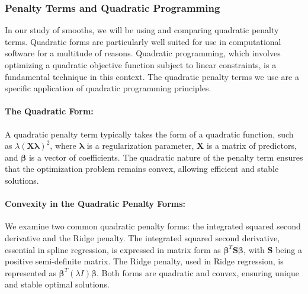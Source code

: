 \documentclass[12pt, twoside,hidelinks]{article}
\theoremstyle{definition}
\numberwithin{equation}{section}
\begin{document}
\subsubsection{Penalty Terms and Quadratic Programming}\label{sec:smooth:penreg:quadratic}

In our study of smooths, we will be using and comparing quadratic penalty terms. Quadratic forms are particularly well suited for use in computational software for a multitude of reasons. Quadratic programming, which involves optimizing a quadratic objective function subject to linear constraints, is a fundamental technique in this context. The quadratic penalty terms we use are a specific application of quadratic programming principles.

\paragraph{The Quadratic Form:}
A quadratic penalty term typically takes the form of a quadratic function, such as \( \lambda (\mathbf{X}\boldsymbol{\lambda})^2 \), where \( \boldsymbol{\lambda} \) is a regularization parameter, \( \mathbf{X} \) is a matrix of predictors, and \( \boldsymbol{\beta} \) is a vector of coefficients. The quadratic nature of the penalty term ensures that the optimization problem remains convex, allowing efficient and stable solutions.

\paragraph{Convexity in the Quadratic Penalty Forms:}
We examine two common quadratic penalty forms: the integrated squared second derivative and the Ridge penalty. The integrated squared second derivative, essential in spline regression, is expressed in matrix form as \( \boldsymbol{\beta}^T \mathbf{S} \boldsymbol{\beta} \), with \( \mathbf{S} \) being a positive semi-definite matrix. The Ridge penalty, used in Ridge regression, is represented as \( \boldsymbol{\beta}^T (\lambda I) \boldsymbol{\beta} \). Both forms are quadratic and convex, ensuring unique and stable optimal solutions.
\end{document}
